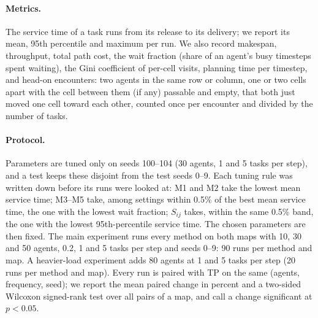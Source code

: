\paragraph{Metrics.}
The service time of a task runs from its release to its delivery; we report
its mean, 95th percentile and maximum per run. We also record makespan,
throughput, total path cost, the wait fraction (share of an agent's busy
timesteps spent waiting), the Gini coefficient of per-cell visits, planning
time per timestep, and head-on encounters: two agents in the same row or
column, one or two cells apart with the cell between them (if any) passable
and empty, that both just moved one cell toward each other, counted once per
encounter and divided by the number of tasks.

\paragraph{Protocol.}
Parameters are tuned only on seeds 100--104 (30 agents, 1 and 5 tasks per
step), and a test keeps these disjoint from the test seeds 0--9. Each tuning
rule was written down before its runs were looked at: M1 and M2 take the lowest
mean service time; M3--M5 take, among settings within 0.5\% of the best mean
service time, the one with the lowest wait fraction; $S_{ij}$ takes, within the
same 0.5\% band, the one with the lowest 95th-percentile service time. The
chosen parameters are then fixed. The main experiment runs every method on
both maps with 10, 30 and 50 agents, 0.2, 1 and 5 tasks per step and seeds
0--9: 90 runs per method and map. A heavier-load experiment adds 80 agents at 1
and 5 tasks per step (20 runs per method and map). Every run is paired with TP
on the same (agents, frequency, seed); we report the mean paired change in
percent and a two-sided Wilcoxon signed-rank test over all pairs of a map, and
call a change significant at $p<0.05$.
